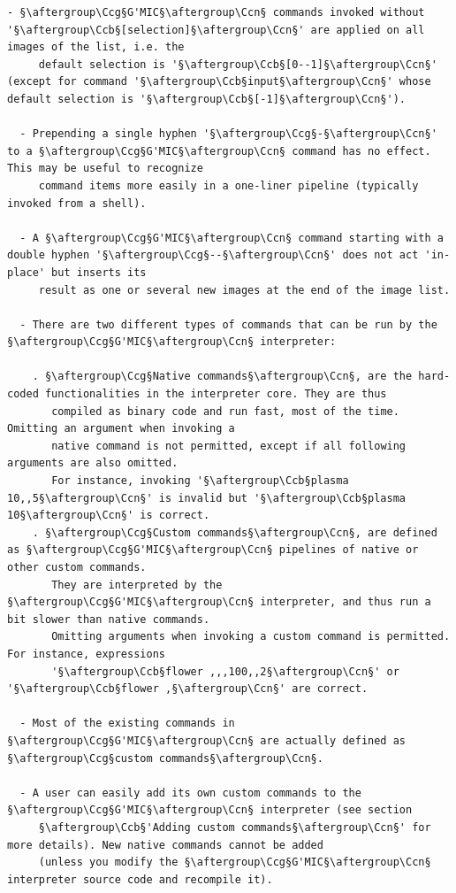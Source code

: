 \documentclass[a4paper,10.5pt,twoside]{book}
\def\Ccb{\color{cb}}
\def\Ccg{\color{cc}}
\def\Ccn{\color{black}}
\begin{document}
\begin{lstlisting}[escapechar=§]
  - §\aftergroup\Ccg§G'MIC§\aftergroup\Ccn§ commands invoked without '§\aftergroup\Ccb§[selection]§\aftergroup\Ccn§' are applied on all images of the list, i.e. the 
     default selection is '§\aftergroup\Ccb§[0--1]§\aftergroup\Ccn§' (except for command '§\aftergroup\Ccb§input§\aftergroup\Ccn§' whose default selection is '§\aftergroup\Ccb§[-1]§\aftergroup\Ccn§'). 
 
  - Prepending a single hyphen '§\aftergroup\Ccg§-§\aftergroup\Ccn§' to a §\aftergroup\Ccg§G'MIC§\aftergroup\Ccn§ command has no effect. This may be useful to recognize 
     command items more easily in a one-liner pipeline (typically invoked from a shell). 
 
  - A §\aftergroup\Ccg§G'MIC§\aftergroup\Ccn§ command starting with a double hyphen '§\aftergroup\Ccg§--§\aftergroup\Ccn§' does not act 'in-place' but inserts its 
     result as one or several new images at the end of the image list. 
 
  - There are two different types of commands that can be run by the §\aftergroup\Ccg§G'MIC§\aftergroup\Ccn§ interpreter: 
 
    . §\aftergroup\Ccg§Native commands§\aftergroup\Ccn§, are the hard-coded functionalities in the interpreter core. They are thus 
       compiled as binary code and run fast, most of the time. Omitting an argument when invoking a 
       native command is not permitted, except if all following arguments are also omitted. 
       For instance, invoking '§\aftergroup\Ccb§plasma 10,,5§\aftergroup\Ccn§' is invalid but '§\aftergroup\Ccb§plasma 10§\aftergroup\Ccn§' is correct. 
    . §\aftergroup\Ccg§Custom commands§\aftergroup\Ccn§, are defined as §\aftergroup\Ccg§G'MIC§\aftergroup\Ccn§ pipelines of native or other custom commands. 
       They are interpreted by the §\aftergroup\Ccg§G'MIC§\aftergroup\Ccn§ interpreter, and thus run a bit slower than native commands. 
       Omitting arguments when invoking a custom command is permitted. For instance, expressions 
       '§\aftergroup\Ccb§flower ,,,100,,2§\aftergroup\Ccn§' or '§\aftergroup\Ccb§flower ,§\aftergroup\Ccn§' are correct. 
 
  - Most of the existing commands in §\aftergroup\Ccg§G'MIC§\aftergroup\Ccn§ are actually defined as §\aftergroup\Ccg§custom commands§\aftergroup\Ccn§. 
 
  - A user can easily add its own custom commands to the §\aftergroup\Ccg§G'MIC§\aftergroup\Ccn§ interpreter (see section 
     §\aftergroup\Ccb§'Adding custom commands§\aftergroup\Ccn§' for more details). New native commands cannot be added 
     (unless you modify the §\aftergroup\Ccg§G'MIC§\aftergroup\Ccn§ interpreter source code and recompile it).
\end{lstlisting}
\end{document}
